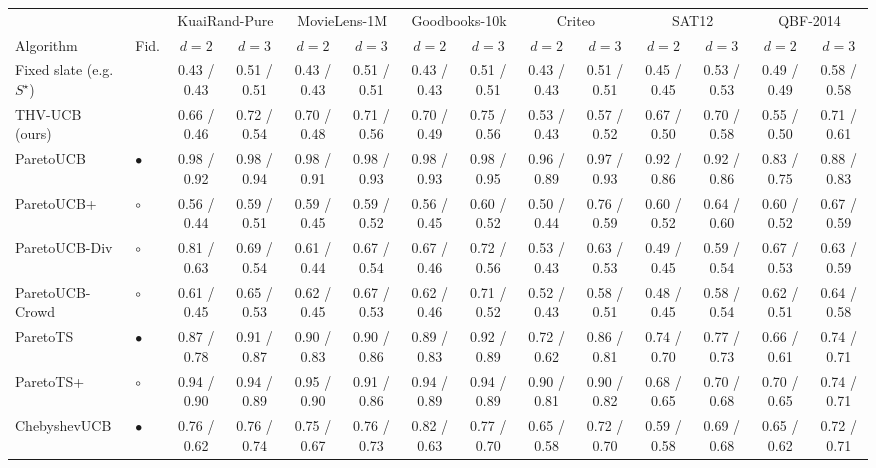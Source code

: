 \begin{tabular}{llcccccccccccc}
\toprule
 & & \multicolumn{2}{c}{KuaiRand-Pure} & \multicolumn{2}{c}{MovieLens-1M} & \multicolumn{2}{c}{Goodbooks-10k} & \multicolumn{2}{c}{Criteo} & \multicolumn{2}{c}{SAT12} & \multicolumn{2}{c}{QBF-2014}\\
\cmidrule(lr){3-4}\cmidrule(lr){5-6}\cmidrule(lr){7-8}\cmidrule(lr){9-10}\cmidrule(lr){11-12}\cmidrule(lr){13-14}
Algorithm & Fid. & $d=2$ & $d=3$ & $d=2$ & $d=3$ & $d=2$ & $d=3$ & $d=2$ & $d=3$ & $d=2$ & $d=3$ & $d=2$ & $d=3$\\
\midrule
Fixed slate (e.g.\ $S^\star$) & & 0.43 / 0.43 & 0.51 / 0.51 & 0.43 / 0.43 & 0.51 / 0.51 & 0.43 / 0.43 & 0.51 / 0.51 & 0.43 / 0.43 & 0.51 / 0.51 & 0.45 / 0.45 & 0.53 / 0.53 & 0.49 / 0.49 & 0.58 / 0.58\\
\midrule
THV-UCB (ours) &  & 0.66 / 0.46 & 0.72 / 0.54 & 0.70 / 0.48 & 0.71 / 0.56 & 0.70 / 0.49 & 0.75 / 0.56 & 0.53 / 0.43 & 0.57 / 0.52 & 0.67 / 0.50 & 0.70 / 0.58 & 0.55 / 0.50 & 0.71 / 0.61\\
\midrule
ParetoUCB & $\bullet$ & 0.98 / 0.92 & 0.98 / 0.94 & 0.98 / 0.91 & 0.98 / 0.93 & 0.98 / 0.93 & 0.98 / 0.95 & 0.96 / 0.89 & 0.97 / 0.93 & 0.92 / 0.86 & 0.92 / 0.86 & 0.83 / 0.75 & 0.88 / 0.83\\
ParetoUCB+ & $\circ$ & 0.56 / 0.44 & 0.59 / 0.51 & 0.59 / 0.45 & 0.59 / 0.52 & 0.56 / 0.45 & 0.60 / 0.52 & 0.50 / 0.44 & 0.76 / 0.59 & 0.60 / 0.52 & 0.64 / 0.60 & 0.60 / 0.52 & 0.67 / 0.59\\
ParetoUCB-Div & $\circ$ & 0.81 / 0.63 & 0.69 / 0.54 & 0.61 / 0.44 & 0.67 / 0.54 & 0.67 / 0.46 & 0.72 / 0.56 & 0.53 / 0.43 & 0.63 / 0.53 & 0.49 / 0.45 & 0.59 / 0.54 & 0.67 / 0.53 & 0.63 / 0.59\\
ParetoUCB-Crowd & $\circ$ & 0.61 / 0.45 & 0.65 / 0.53 & 0.62 / 0.45 & 0.67 / 0.53 & 0.62 / 0.46 & 0.71 / 0.52 & 0.52 / 0.43 & 0.58 / 0.51 & 0.48 / 0.45 & 0.58 / 0.54 & 0.62 / 0.51 & 0.64 / 0.58\\
ParetoTS & $\bullet$ & 0.87 / 0.78 & 0.91 / 0.87 & 0.90 / 0.83 & 0.90 / 0.86 & 0.89 / 0.83 & 0.92 / 0.89 & 0.72 / 0.62 & 0.86 / 0.81 & 0.74 / 0.70 & 0.77 / 0.73 & 0.66 / 0.61 & 0.74 / 0.71\\
ParetoTS+ & $\circ$ & 0.94 / 0.90 & 0.94 / 0.89 & 0.95 / 0.90 & 0.91 / 0.86 & 0.94 / 0.89 & 0.94 / 0.89 & 0.90 / 0.81 & 0.90 / 0.82 & 0.68 / 0.65 & 0.70 / 0.68 & 0.70 / 0.65 & 0.74 / 0.71\\
ChebyshevUCB & $\bullet$ & 0.76 / 0.62 & 0.76 / 0.74 & 0.75 / 0.67 & 0.76 / 0.73 & 0.82 / 0.63 & 0.77 / 0.70 & 0.65 / 0.58 & 0.72 / 0.70 & 0.59 / 0.58 & 0.69 / 0.68 & 0.65 / 0.62 & 0.72 / 0.71\\

\end{tabular}
